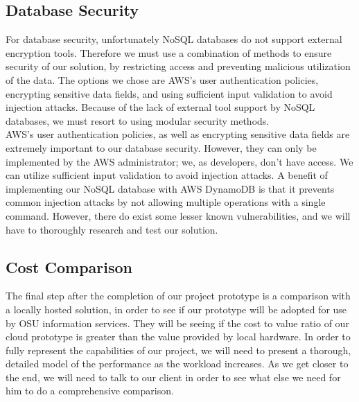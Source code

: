 	\subsection{Database Security}
For database security, unfortunately NoSQL databases do not support external encryption tools. Therefore we must use a combination of methods to ensure security of our solution, by restricting access and preventing malicious utilization of the data. The options we chose are AWS’s user authentication policies, encrypting sensitive data fields, and using sufficient input validation to avoid injection attacks. Because of the lack of external tool support by NoSQL databases, we must resort to using modular security methods.\\

\noindent AWS’s user authentication policies, as well as encrypting sensitive data fields are extremely important to our database security. However, they can only be implemented by the AWS administrator; we, as developers, don’t have access. We can utilize sufficient input validation to avoid injection attacks. A benefit of implementing our NoSQL database with AWS DynamoDB is that it prevents common injection attacks by not allowing multiple operations with a single command. However, there do exist some lesser known vulnerabilities, and we will have to thoroughly research and test our solution.
	\subsection{Cost Comparison}
The final step after the completion of our project prototype is a comparison with a locally hosted solution, in order to see if our prototype will be adopted for use by OSU information services. They will be seeing if the cost to value ratio of our cloud prototype is greater than the value provided by local hardware. In order to fully represent the capabilities of our project, we will need to present a thorough, detailed model of the performance as the workload increases. As we get closer to the end, we will need to talk to our client in order to see what else we need for him to do a comprehensive comparison.